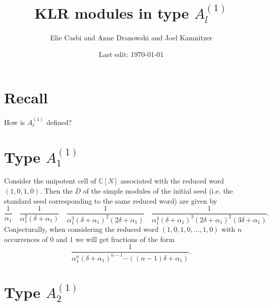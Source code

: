 \documentclass[11pt]{article}
\begin{document}
\theoremstyle{plain}
\newtheorem{deftn}{Definition}[section]
\newtheorem{lem}[deftn]{Lemma}
\newtheorem{prop}[deftn]{Proposition}
\newtheorem{thm}[deftn]{Theorem}
\newtheorem{cor}[deftn]{Corollary}
\newtheorem{conj}[deftn]{Conjecture}
\newtheorem{Question}[deftn]{Question}
\newtheorem{Fact}{Evidence}
\newtheorem{assump}{Assumption}[section]
\renewcommand{\theassump}{\Alph{assump}}
\newtheorem{conjintro}{Conjecture}
\newtheorem{thmintro}{Theorem}

\theoremstyle{definition}
\newtheorem{ex}[deftn]{Example}
\newtheorem{rk}[deftn]{Remark}


\newcommand{\CQ}{\mathcal{C}_Q}
\newcommand{\CZ}{\mathcal{C}_{\mathbb{Z}}}
\newcommand{\Atn}{\mathcal{A}_t (\mathfrak{n})}
\newcommand{\CN}{\mathbb{C}[N]}


\title{KLR modules in type $A_l^{(1)}$}
\author{Elie Casbi and Anne Dranowski and Joel Kamnitzer}
 
\date{Last edit: \today}

\maketitle

\section{Recall}

How is $A_l^{(1)}$ defined? 

\section{Type $A_1^{(1)}$}

Consider the unipotent cell of $\CN$ associated with the reduced word $(1,0,1,0)$. Then the $\bar{D}$ of the simple modules of the  initial seed (i.e. the standard seed corresponding to the same reduced word) are given by 
$$ \frac{1}{\alpha_1} \quad  \frac{1}{\alpha_1^2(\delta + \alpha_1)} \quad  \frac{1}{\alpha_1^3(\delta + \alpha_1)^2(2 \delta + \alpha_1)} \quad \frac{1}{\alpha_1^4(\delta + \alpha_1)^3(2 \delta + \alpha_1)^2(3 \delta + \alpha_1)} . $$ 
Conjecturally, when considering the reduced word $(1,0,1,0, \ldots , 1,0)$ with $n$ occurrences of $0$ and $1$ we will get fractions of the form 
$$  \frac{1}{\alpha_1^n(\delta + \alpha_1)^{n-1} \cdots ((n-1) \delta + \alpha_1)} . $$ 

\section{Type $A_2^{(1)}$}
\end{document}
